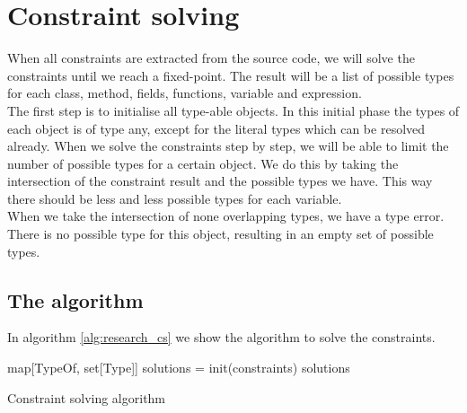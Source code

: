 \documentclass[../main.tex]{subfiles}
\begin{document}
    \section{Constraint solving}\label{sec:implementation:constraint_solving}
    When all constraints are extracted from the source code, we will solve the constraints until we reach a fixed-point.
    The result will be a list of possible types for each class, method, fields, functions, variable and expression.
    \\
    The first step is to initialise all type-able objects.
    In this initial phase the types of each object is of type any, except for the literal types which can be resolved already.
    When we solve the constraints step by step, we will be able to limit the number of possible types for a certain object.
    We do this by taking the intersection of the constraint result and the possible types we have.
    This way there should be less and less possible types for each variable.
    \\
    When we take the intersection of none overlapping types, we have a type error.
    There is no possible type for this object, resulting in an empty set of possible types.
    
    \subsection{The algorithm}
    In algorithm \ref{alg:research_cs} we show the algorithm to solve the constraints.
        
    \vspace{5 mm}
    \begin{algorithm}[H]
     \BlankLine
	 map[TypeOf, set[Type]] solutions = init(constraints)\;           \label{alg:research_cs:init_solutions}
     \BlankLine
	                                                                  \label{alg:research_cs:loop_end}
	 \BlankLine
	 \Return solutions\;     \label{alg:research_cs:return}
	 \caption{Constraint solving algorithm}
	 \label{alg:research_cs}
	\end{algorithm}
    
\end{document}
